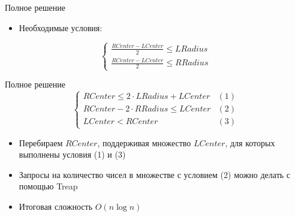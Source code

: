 \begin{frame}{Полное решение}
  \begin{itemize}
    \item Необходимые условия:
  \end{itemize}
  \begin{equation*}
    \begin{cases}
      \frac{RCenter - LCenter}{2} \leq LRadius 
      \\
      \frac{RCenter - LCenter}{2} \leq RRadius
    \end{cases}
  \end{equation*}
\end{frame}

\begin{frame}{Полное решение}
  \begin{equation*}
    \begin{cases}
      RCenter \leq 2 \cdot LRadius + LCenter & (1)
      \\
      RCenter - 2 \cdot RRadius \leq LCenter  & (2)
      \\
      LCenter < RCenter & (3)
    \end{cases}
  \end{equation*}
  \begin{itemize}
    \item Перебираем $RCenter$, поддерживая множество $LCenter$, для которых выполнены условия (1) и (3)
    \item Запросы на количество чисел в множестве с условием (2) можно делать с помощью Treap
    \item Итоговая сложность $O(n \log{n})$
  \end{itemize}
\end{frame}
